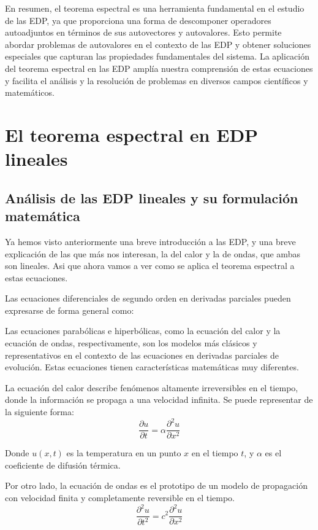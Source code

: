 \documentclass{article}
\begin{document}
    En resumen, el teorema espectral es una herramienta fundamental en el estudio de las EDP, ya que proporciona una forma de descomponer operadores autoadjuntos en términos de sus autovectores y autovalores. Esto permite abordar problemas de autovalores en el contexto de las EDP y obtener soluciones especiales que capturan las propiedades fundamentales del sistema. La aplicación del teorema espectral en las EDP amplía nuestra comprensión de estas ecuaciones y facilita el análisis y la resolución de problemas en diversos campos científicos y matemáticos.


\newpage

\section{El teorema espectral en EDP lineales}
    \subsection{Análisis de las EDP lineales y su formulación matemática}
    Ya hemos visto anteriormente una breve introducción a las EDP, y una breve explicación de las que más nos interesan, la del calor y la de ondas, que ambas son lineales. Asi que ahora vamos a ver como se aplica el teorema espectral a estas ecuaciones. 


    Las ecuaciones diferenciales de segundo orden en derivadas parciales pueden expresarse de forma general como:


    Las ecuaciones parabólicas e hiperbólicas, como la ecuación del calor y la ecuación de ondas, respectivamente, son los modelos más clásicos y representativos en el contexto de las ecuaciones en derivadas parciales de evolución. Estas ecuaciones tienen características matemáticas muy diferentes. 

    La ecuación del calor describe fenómenos altamente irreversibles en el tiempo, donde la información se propaga a una velocidad infinita. Se puede representar de la siguiente forma:
    \begin{equation}
        \frac{\partial u}{\partial t} = \alpha \frac{\partial^2 u}{\partial x^2}
        \end{equation}
    
        Donde $u(x,t)$ es la temperatura en un punto $x$ en el tiempo $t$, y $\alpha$ es el coeficiente de difusión térmica.

    Por otro lado, la ecuación de ondas es el prototipo de un modelo de propagación con velocidad finita y completamente reversible en el tiempo.
    \begin{equation}
        \frac{\partial^2 u}{\partial t^2} = c^2 \frac{\partial^2 u}{\partial x^2}
        \end{equation}
        
\end{document}
